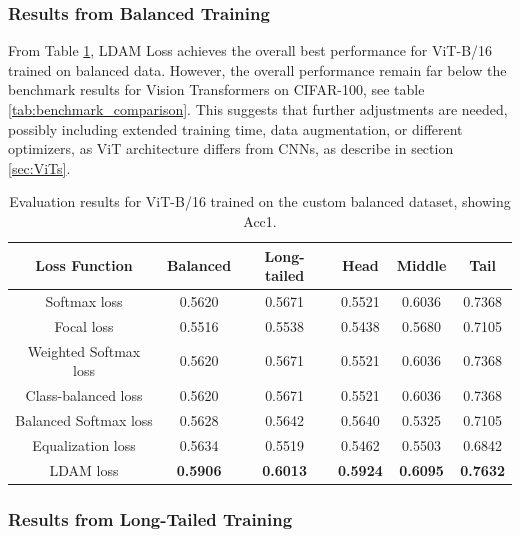 \subsubsection{Results from Balanced Training}

From Table \ref{tab:vit_bal_acc1_1}, LDAM Loss achieves the overall best performance for ViT-B/16 trained on balanced data. However, the overall performance remain far below the benchmark results for Vision Transformers on CIFAR-100, see table \ref{tab:benchmark_comparison}. This suggests that further adjustments are needed, possibly including extended training time, data augmentation, or different optimizers, as ViT architecture differs from CNNs, as describe in section \ref{sec:ViTs}. 

\begin{table}[h!]
    \centering
    \caption{Evaluation results for ViT-B/16 trained on the custom balanced dataset, showing Acc1.}
    \begin{tabular}{cccccc}
        \toprule
        Loss Function & Balanced & Long-tailed & Head & Middle & Tail \\ 
        \midrule
        Softmax loss   & 0.5620 & 0.5671 & 0.5521 & 0.6036 & 0.7368 \\
        Focal loss   & 0.5516 & 0.5538 & 0.5438 & 0.5680 & 0.7105 \\
        Weighted Softmax loss   & 0.5620 & 0.5671 & 0.5521 & 0.6036 & 0.7368 \\
        Class-balanced loss   & 0.5620 & 0.5671 &  0.5521 & 0.6036 & 0.7368 \\
        Balanced Softmax loss   & 0.5628 & 0.5642 & 0.5640 & 0.5325 & 0.7105 \\
        Equalization loss   & 0.5634   & 0.5519 & 0.5462 & 0.5503 & 0.6842 \\
        LDAM loss   & \textbf{0.5906} &  \textbf{0.6013} & \textbf{0.5924} & \textbf{0.6095} & \textbf{0.7632} \\
        \bottomrule
    \end{tabular}
    \label{tab:vit_bal_acc1_1}
\end{table}

\subsubsection{Results from Long-Tailed Training}


